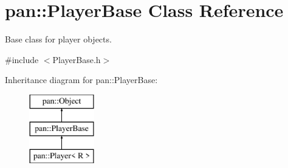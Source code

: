 \hypertarget{classpan_1_1_player_base}{}\section{pan\+:\+:Player\+Base Class Reference}
\label{classpan_1_1_player_base}


Base class for player objects.  




{\ttfamily \#include $<$Player\+Base.\+h$>$}

Inheritance diagram for pan\+:\+:Player\+Base\+:\begin{figure}[H]
\begin{center}
\leavevmode
\includegraphics[height=3.000000cm]{classpan_1_1_player_base}
\end{center}
\end{figure}

